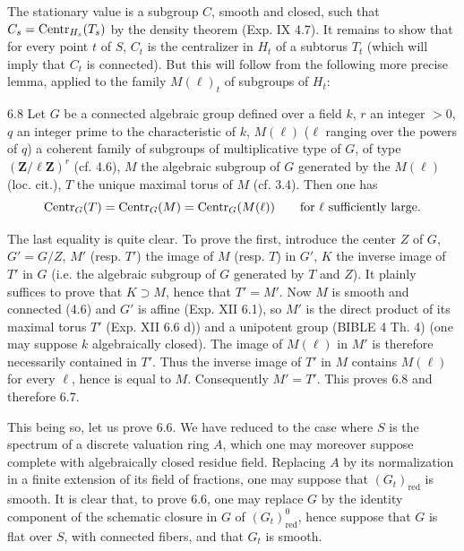 The stationary value is a subgroup $C$, smooth and closed, such that $C_s=\operatorname{Centr}_{H_s}(T_s)$ by the density theorem (Exp. IX 4.7). It remains to show that for every point $t$ of $S$, $C_t$ is the centralizer in $H_t$ of a subtorus $T_t$ (which will imply that $C_t$ is connected). But this will follow from the following more precise lemma, applied to the family $M(\ell)_t$ of subgroups of $H_t$:
\begin{lemma}{6.8}\label{XV.6.8}
Let $G$ be a connected algebraic group defined over a field $k$, $r$ an integer $>0$, $q$ an integer prime to the characteristic of $k$, $M(\ell)$ ($\ell$ ranging over the powers of $q$) a coherent family of subgroups of multiplicative type of $G$, of type $(\mathbf Z/\ell\mathbf Z)^r$ (cf. 4.6), $M$ the algebraic subgroup of $G$ generated by the $M(\ell)$ (loc. cit.), $T$ the unique maximal torus of $M$ (cf. 3.4). Then one has
\[
\operatorname{Centr}_G(T)=\operatorname{Centr}_G(M)=\operatorname{Centr}_G(M(\ell))\qquad\text{for $\ell$ sufficiently large.}
\]
\end{lemma}
The last equality is quite clear. To prove the first, introduce the center $Z$ of $G$, $G'=G/Z$, $M'$ (resp. $T'$) the image of $M$ (resp. $T$) in $G'$, $K$ the inverse image of $T'$ in $G$ (i.e. the algebraic subgroup of $G$ generated by $T$ and $Z$). It plainly suffices to prove that $K\supset M$, hence that $T'=M'$. Now $M$ is smooth and connected (4.6) and $G'$ is affine (Exp. XII 6.1), so $M'$ is the direct product of its maximal torus $T'$ (Exp. XII 6.6 d)) and a unipotent group (BIBLE 4 Th. 4) (one may suppose $k$ algebraically closed). The image of $M(\ell)$ in $M'$ is therefore necessarily contained in $T'$. Thus the inverse image of $T'$ in $M$ contains $M(\ell)$ for every $\ell$, hence is equal to $M$. Consequently $M'=T'$. This proves 6.8 and therefore 6.7.

This being so, let us prove 6.6. We have reduced to the case where $S$ is the spectrum of a discrete valuation ring $A$, which one may moreover suppose complete with algebraically closed residue field. Replacing $A$ by its normalization in a finite extension of its field of fractions, one may suppose that $(G_t)_{\mathrm{red}}$ is smooth. It is clear that, to prove 6.6, one may replace $G$ by the identity component of the schematic closure in $G$ of $(G_t)^0_{\mathrm{red}}$, hence suppose that $G$ is flat over $S$, with connected fibers, and that $G_t$ is smooth.

